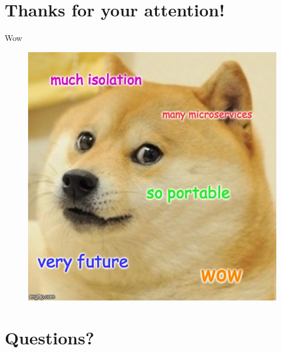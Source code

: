 \documentclass[aspectratio=169]{beamer}
\begin{document}
	\section{Thanks for your attention!}
	
	\begin{frame}{Wow}
	    \begin{figure}
	  		\includegraphics[width=0.9\textheight]{./assets/wow.jpg}
	    \end{figure}
	\end{frame}
	
	\section{Questions?}
	
\end{document}
